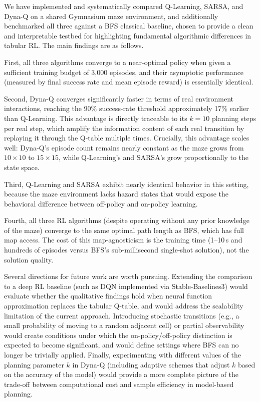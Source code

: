 \documentclass[11pt]{article}
\begin{document}
We have implemented and systematically compared Q-Learning, SARSA, and
Dyna-Q on a shared Gymnasium maze environment, and additionally
benchmarked all three against a BFS classical baseline, chosen to provide
a clean and interpretable testbed for highlighting fundamental algorithmic
differences in tabular RL. The main findings are as follows.

First, all three algorithms converge to a near-optimal policy when
given a sufficient training budget of 3{,}000 episodes, and their
asymptotic performance (measured by final success rate and mean
episode reward) is essentially identical.

Second, Dyna-Q converges significantly faster in terms of real
environment interactions, reaching the 90\% success-rate threshold
approximately 17\% earlier than Q-Learning. This advantage is directly
traceable to its $k = 10$ planning steps per real step, which amplify
the information content of each real transition by replaying it through
the Q-table multiple times. Crucially, this advantage scales well:
Dyna-Q's episode count remains nearly constant as the maze grows from
$10\times10$ to $15\times15$, while Q-Learning's and SARSA's grow
proportionally to the state space.

Third, Q-Learning and SARSA exhibit nearly identical behavior in this
setting, because the maze environment lacks hazard states that would
expose the behavioral difference between off-policy and on-policy
learning.

Fourth, all three RL algorithms (despite operating without any prior
knowledge of the maze) converge to the same optimal path length as BFS,
which has full map access. The cost of this map-agnosticism is the
training time (1--10\,s and hundreds of episodes versus BFS's
sub-millisecond single-shot solution), not the solution quality.

Several directions for future work are worth pursuing. Extending the
comparison to a deep RL baseline (such as DQN implemented via
Stable-Baselines3) would evaluate whether the qualitative findings hold
when neural function approximation replaces the tabular Q-table, and
would address the scalability limitation of the current approach.
Introducing stochastic transitions (e.g., a small probability of moving
to a random adjacent cell) or partial observability would create
conditions under which the on-policy/off-policy distinction is expected
to become significant, and would define settings where BFS can no longer
be trivially applied. Finally, experimenting with different values of
the planning parameter $k$ in Dyna-Q (including adaptive schemes that
adjust $k$ based on the accuracy of the model) would provide a more
complete picture of the trade-off between computational cost and sample
efficiency in model-based planning.
\end{document}
